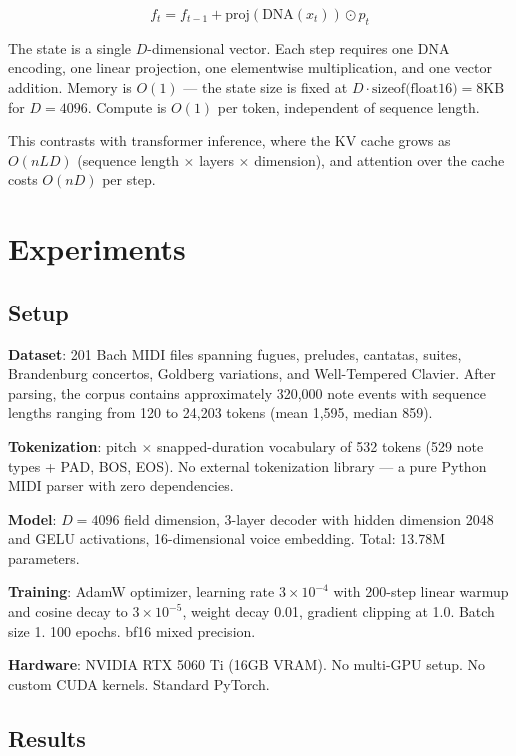 \documentclass[11pt]{article}
\begin{document}
\begin{equation}
f_t = f_{t-1} + \text{proj}(\text{DNA}(x_t)) \odot p_t
\end{equation}

The state is a single $D$-dimensional vector. Each step requires one DNA encoding, one linear projection, one elementwise multiplication, and one vector addition. Memory is $O(1)$ — the state size is fixed at $D \cdot \text{sizeof(float16)} = 8\text{KB}$ for $D = 4096$. Compute is $O(1)$ per token, independent of sequence length.

This contrasts with transformer inference, where the KV cache grows as $O(nLD)$ (sequence length $\times$ layers $\times$ dimension), and attention over the cache costs $O(nD)$ per step.

\section{Experiments}

\subsection{Setup}

\textbf{Dataset}: 201 Bach MIDI files spanning fugues, preludes, cantatas, suites, Brandenburg concertos, Goldberg variations, and Well-Tempered Clavier. After parsing, the corpus contains approximately 320,000 note events with sequence lengths ranging from 120 to 24,203 tokens (mean 1,595, median 859).

\textbf{Tokenization}: pitch $\times$ snapped-duration vocabulary of 532 tokens (529 note types + PAD, BOS, EOS). No external tokenization library — a pure Python MIDI parser with zero dependencies.

\textbf{Model}: $D = 4096$ field dimension, 3-layer decoder with hidden dimension 2048 and GELU activations, 16-dimensional voice embedding. Total: 13.78M parameters.

\textbf{Training}: AdamW optimizer, learning rate $3 \times 10^{-4}$ with 200-step linear warmup and cosine decay to $3 \times 10^{-5}$, weight decay 0.01, gradient clipping at 1.0. Batch size 1. 100 epochs. bf16 mixed precision.

\textbf{Hardware}: NVIDIA RTX 5060 Ti (16GB VRAM). No multi-GPU setup. No custom CUDA kernels. Standard PyTorch.

\subsection{Results}
\end{document}
